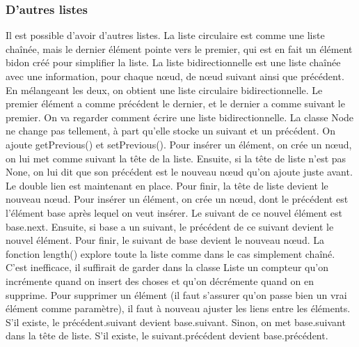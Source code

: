 \documentclass[10pt]{article}
\begin{document}
\subsubsection{D'autres listes}
Il est possible d'avoir d'autres listes. La liste circulaire est comme une liste chaînée, mais le dernier élément pointe vers le premier, qui est en fait un élément bidon créé pour simplifier la liste. 
\newline \newline 
La liste bidirectionnelle est une liste chaînée avec une information, pour chaque nœud, de nœud suivant ainsi que précédent. 
\newline \newline 
En mélangeant les deux, on obtient une liste circulaire bidirectionnelle. Le premier élément a comme précédent le dernier, et le dernier a comme suivant le premier. 
\newline \newline 
On va regarder comment écrire une liste bidirectionnelle. La classe Node ne change pas tellement, à part qu'elle stocke un suivant et un précédent. On ajoute getPrevious() et setPrevious(). 
\newline \newline 
Pour insérer un élément, on crée un nœud, on lui met comme suivant la tête de la liste. Ensuite, si la tête de liste n'est pas None, on lui dit que son précédent est le nouveau nœud qu'on ajoute juste avant. Le double lien est maintenant en place. Pour finir, la tête de liste devient le nouveau nœud.
\newline \newline 
Pour insérer un élément, on crée un nœud, dont le précédent est l'élément base après lequel on veut insérer. Le suivant de ce nouvel élément est base.next. Ensuite, si base a un suivant, le précédent de ce suivant devient le nouvel élément. Pour finir, le suivant de base devient le nouveau nœud.
\newline \newline 
La fonction length() explore toute la liste comme dans le cas simplement chaîné. C'est inefficace, il suffirait de garder dans la classe Liste un compteur qu'on incrémente quand on insert des choses et qu'on décrémente quand on en supprime. 
\newline \newline 
Pour supprimer un élément (il faut s'assurer qu'on passe bien un vrai élément comme paramètre), il faut à nouveau ajuster les liens entre les éléments. S'il existe, le précédent.suivant devient base.suivant. Sinon, on met base.suivant dans la tête de liste. S'il existe, le suivant.précédent devient base.précédent.
\end{document}
